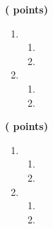 \documentclass[12pt,french]{book}
\begin{document}
\begin{spacing}{1.2}

\medskip\exercice \hfill \textbf{( points)}\par
\begin{enumerate}[label=\arabic*.]
\item 
	\begin{enumerate}[label=\alph*)]
		
	\item 

		
	\item
	
	\end{enumerate}

\item 
\begin{enumerate}[label=\alph*)]
	\item 
	
	\item 
	
		
	\end{enumerate}

\end{enumerate}




\medskip\exercice \hfill \textbf{( points)}\par
\begin{enumerate}[label=\arabic*.]
\item 
	\begin{enumerate}[label=\alph*)]
		
	\item 

		
	\item
	
	\end{enumerate}

\item 
\begin{enumerate}[label=\alph*)]
	\item 
	
	\item 
	
		
	\end{enumerate}

\end{enumerate}







\end{spacing}
\end{document}
